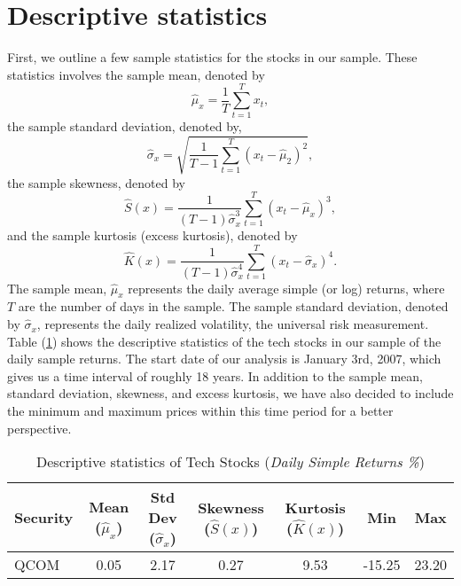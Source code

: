 \section{Descriptive statistics}
First, we outline a few sample statistics for the stocks in our sample. These statistics involves the sample mean, denoted by
\begin{equation}
	\hat{\mu}_x=\frac{1}{T}\sum_{t=1}^{T}x_t,
\end{equation}
the sample standard deviation, denoted by,
\begin{equation}
	\hat{\sigma}_x=\sqrt{\frac{1}{T-1}\sum_{t=1}^{T}\left(x_t-\hat{\mu}_2\right)^2},
\end{equation}
the sample skewness, denoted by
\begin{equation}
	\hat{S}(x)=\frac{1}{\left(T-1\right)\hat{\sigma}^3_x}\sum_{t=1}^{T}\left(x_t-\hat{\mu}_x\right)^3,
\end{equation}
and the sample kurtosis (excess kurtosis), denoted by
\begin{equation}
	\hat{K}(x)=\frac{1}{\left(T-1\right)\hat{\sigma}^4_x}\sum_{t=1}^{T}\left(x_t-\hat{\sigma}_x\right)^4.
\end{equation}
The sample mean, $\hat{\mu}_x$ represents the daily average simple (or log) returns, where $T$ are the number of days in the sample. The sample standard deviation, denoted by $\hat{\sigma}_x$, represents the daily realized volatility, the universal risk measurement. Table (\ref{tab:descriptive}) shows the descriptive statistics of the tech stocks in our sample of the daily sample returns. The start date of our analysis is January 3rd, 2007, which gives us a time interval of roughly 18 years. In addition to the sample mean, standard deviation, skewness, and excess kurtosis, we have also decided to include the minimum and maximum prices within this time period for a better perspective.
\begin{table}[ht]
	\centering
	\caption{Descriptive statistics of Tech Stocks (\textit{Daily Simple Returns \%})}
	\begin{tabular}[t]{lcccccc}
		\toprule
		Security & Mean ($\hat{\mu}_x$) & Std Dev ($\hat{\sigma}_x$) & Skewness ($\hat{S}(x)$) & Kurtosis ($\hat{K}(x)$) &Min&Max \\
		\midrule
		QCOM & 0.05 & 2.17 & 0.27 & 9.53 &-15.25&23.20 \\
		\bottomrule
	\end{tabular}\label{tab:descriptive}
\end{table}

